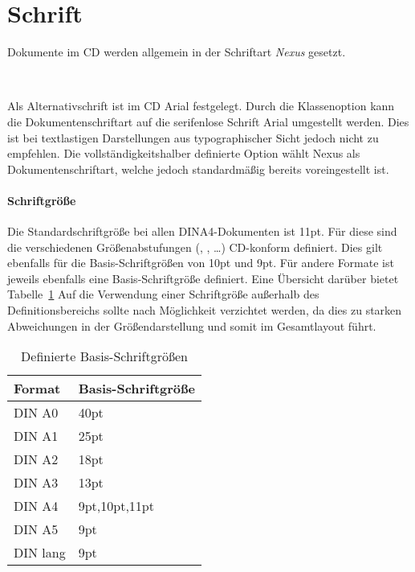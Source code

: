 \section{Schrift}\label{subsec:documents:fonts}

Dokumente im \acs{CD} werden allgemein in der Schriftart \emph{Nexus}
gesetzt.

\begin{Declaration}
  \\
\end{Declaration}

Als Alternativschrift ist im \acs{CD} Arial festgelegt. Durch die Klassenoption
 kann die Dokumentenschriftart auf die serifenlose Schrift
Arial umgestellt werden. Dies ist bei textlastigen Darstellungen aus
typographischer Sicht jedoch nicht zu empfehlen.
Die vollständigkeitshalber definierte Option  wählt Nexus als 
Dokumentenschriftart, welche jedoch standardmäßig bereits voreingestellt ist.


\paragraph{Schriftgröße}

Die Standardschriftgröße bei allen DINA4-Dokumenten ist 11pt.
Für diese sind die verschiedenen Größenabstufungen
(, , \ldots) \acs{CD}-konform definiert.
Dies gilt ebenfalls für die Basis-Schriftgrößen von 10pt und 9pt.
Für andere Formate ist jeweils ebenfalls eine Basis-Schriftgröße definiert.
Eine Übersicht darüber bietet Tabelle~\ref{table:fontsizes}
Auf die Verwendung einer Schriftgröße außerhalb des Definitionsbereichs sollte
nach Möglichkeit verzichtet werden, da dies zu starken Abweichungen in der
Größendarstellung und somit im Gesamtlayout führt.

\begin{table}\centering
\begin{tabular}{ll}
  Format  & Basis-Schriftgröße  \\
  \midrule
  DIN A0  & 40pt \\
  DIN A1  & 25pt \\
  DIN A2  & 18pt \\
  DIN A3  & 13pt \\
  DIN A4  & 9pt,10pt,11pt \\
  DIN A5  & 9pt \\
  DIN lang& 9pt \\
\end{tabular}
\caption{Definierte Basis-Schriftgrößen}\label{table:fontsizes}
\end{table}


